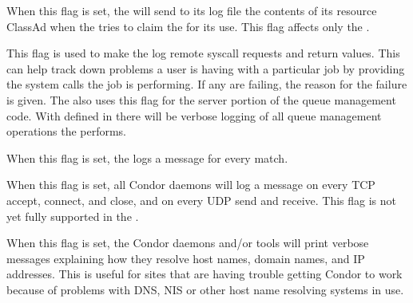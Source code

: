 \begin{description}
\begin{description}
  \label{dflag:machine}
  \item[\Dflag{MACHINE}]
    When this flag is set,
    the  will send to its log file the contents of
    its resource ClassAd when the  tries to claim the
     for its use.  This flag affects only the
    .

  \label{dflag:syscalls}
  \item[\Dflag{SYSCALLS}]
    This flag is used to
    make the  log remote syscall requests and return
    values.  This can help track down problems a user is having with a
    particular job by providing the system calls the job is
    performing. If any are failing, the reason for the
    failure is given.  The  also uses this flag for the server
    portion of the queue management code.  With 
    defined in  there will be verbose logging of all
    queue management operations the  performs.  

  \label{dflag:match}
  \item[\Dflag{MATCH}]
    When this flag is
    set, the  logs a message for every match.

  \label{dflag:network}
  \item[\Dflag{NETWORK}]
    When this flag is set,
    all Condor daemons will log a message on every TCP accept, connect,
    and close, and on every UDP send and receive.  This flag is not
    yet fully supported in the .

  \label{dflag:hostname}
  \item[\Dflag{HOSTNAME}]
    When this flag is set, the Condor daemons and/or tools will print
    verbose messages explaining how they resolve host names, domain
    names, and IP addresses.
    This is useful for sites that are having trouble getting Condor to
    work because of problems with DNS, NIS or other host name resolving
    systems in use.


\end{description}
\end{description}
